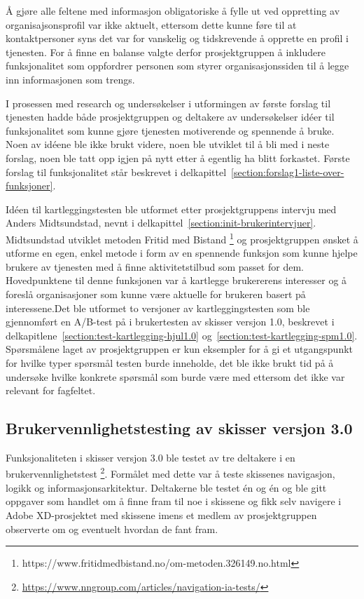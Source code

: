 Å gjøre alle feltene med informasjon obligatoriske å fylle ut ved oppretting av organisajsonsprofil var ikke aktuelt, ettersom dette kunne føre til at kontaktpersoner syns det var for vanskelig og tidskrevende å opprette en profil i tjenesten. For å finne en balanse valgte derfor prosjektgruppen å inkludere funksjonalitet som oppfordrer personen som styrer organisasjonssiden til å legge inn informasjonen som trengs. 

I prosessen med research og undersøkelser i utformingen av første forslag til tjenesten hadde både prosjektgruppen og deltakere av undersøkelser idéer til funksjonalitet som kunne gjøre tjenesten motiverende og spennende å bruke. Noen av idéene ble ikke brukt videre, noen ble utviklet til å bli med i neste forslag, noen ble tatt opp igjen på nytt etter å egentlig ha blitt forkastet. Første forslag til funksjonalitet står beskrevet i delkapittel~\ref{section:forslag1-liste-over-funksjoner}.

Idéen til kartleggingstesten ble utformet etter prosjektgruppens intervju med Anders Midtsundstad, nevnt i delkapittel~\ref{section:init-brukerintervjuer}. Midtsundstad utviklet metoden Fritid med Bistand \footnote{https://www.fritidmedbistand.no/om-metoden.326149.no.html} og prosjektgruppen ønsket å utforme en egen, enkel metode i form av en spennende funksjon som kunne hjelpe brukere av tjenesten med å finne aktivitetstilbud som passet for dem. Hovedpunktene til denne funksjonen var å kartlegge brukererens interesser og å foreslå organisasjoner som kunne være aktuelle for brukeren basert på interessene.Det ble utformet to versjoner av kartleggingstesten som ble gjennomført en A/B-test på i brukertesten av skisser versjon 1.0, beskrevet i delkapitlene~\ref{section:test-kartlegging-hjul1.0} og~\ref{section:test-kartlegging-spm1.0}. Spørsmålene laget av prosjektgruppen er kun eksempler for å gi et utgangspunkt for hvilke typer spørsmål testen burde inneholde, det ble ikke brukt tid på å undersøke hvilke konkrete spørsmål som burde være med ettersom det ikke var relevant for fagfeltet.


\subsection{Brukervennlighetstesting av skisser versjon 3.0}
Funksjonaliteten i skisser versjon 3.0 ble testet av tre deltakere i en brukervennlighetstest \footnote{\url{https://www.nngroup.com/articles/navigation-ia-tests/}}. Formålet med dette var å teste skissenes navigasjon, logikk og informasjonsarkitektur. Deltakerne ble testet én og én og ble gitt oppgaver som handlet om å finne fram til noe i skissene og fikk selv navigere i Adobe XD-prosjektet med skissene imens et medlem av prosjektgruppen observerte om og eventuelt hvordan de fant fram.

